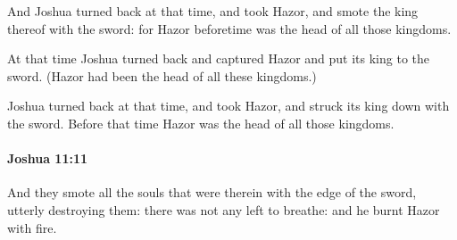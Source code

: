 			\begin{versebox}
					\item[BHS] 
					\item[ASV] And Joshua turned back at that time, and took Hazor, and smote the king thereof with the sword: for Hazor beforetime was the head of all those kingdoms.
					\item[NIV] At that time Joshua turned back and captured Hazor and put its king to the sword. (Hazor had been the head of all these kingdoms.)
					\item[NRSV] Joshua turned back at that time, and took Hazor, and struck its king down with the sword. Before that time Hazor was the head of all those kingdoms.
			\end{versebox}

		\paragraph{Joshua 11:11} %
			\label{JOSHUA-11-11}

			And they smote all the souls that were therein with the edge of the sword, utterly destroying them: there was not any left to breathe: and he burnt Hazor with fire.

